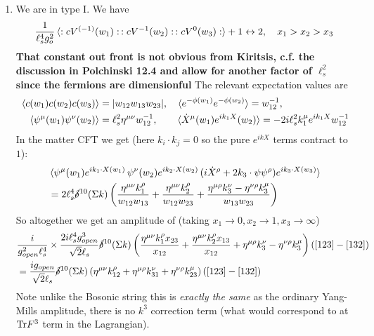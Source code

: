 \documentclass[11pt, class=article, crop=false]{standalone}
\begin{document}
\begin{enumerate}
	\item We are in type I. We have 
	\[
		\frac{1}{\ell_s^4 g_o^2} \braket{:c V^{(-1)}(w_1):\, :c V^{-1}(w_2):\, :c V^{0}(w_3):} + 1 \leftrightarrow 2, \quad x_1 > x_2 > x_3
	\]
	\textbf{That constant out front is not obvious from Kiritsis, c.f. the discussion in Polchinski 12.4 and allow for another factor of $\ell_s^2$ since the fermions are dimensionful}
	The relevant expectation values are
	\[
	\begin{aligned}
		\braket{c(w_1) c(w_2) c(w_3)} &= |w_{12} w_{13} w_{23}|, \quad \braket{e^{-\phi(w_1)} e^{-\phi(w_2)}} = w_{12}^{-1},\\
		\quad \braket{\psi^\mu(w_1) \psi^\nu (w_2)} &= \ell_s^2 \eta^{\mu \nu} w_{12}^{-1}, 
		\qquad \braket{\dot X^\mu(w_1) e^{i k_1 X} (w_2)} = -2 i \ell_s^2 k_1^\mu e^{i k_1 X} w_{12}^{-1} 
	\end{aligned}
	\]
	In the matter CFT we get (here $k_i \cdot k_j = 0$ so the pure $e^{i k X}$ terms contract to $1$):
	\[
	\begin{aligned}
		&\braket{\psi^\mu (w_1) e^{i k_1 \cdot X(w_1)}\, \psi^\nu (w_2) e^{i k_2 \cdot X(w_2)} \, (i \dot X^\rho + 2 k_3 \cdot \psi \psi^\rho) e^{i k_3 \cdot X(w_3)} } \\
		&= 2 \ell_s^4 \cancel\delta^{10}(\Sigma k) \left(\frac{\eta^{\mu \nu}k_1^\rho}{w_{12} w_{13}} + \frac{\eta^{\mu \nu} k_2^\rho}{w_{12} w_{23}} + \frac{\eta^{\mu \rho} k_3^\nu - \eta^{\nu \rho} k_3^\mu}{w_{13} w_{23}} \right)
	\end{aligned}
	\]
	So altogether we get an amplitude of (taking $x_1 \to 0, x_2 \to 1, x_3 \to \infty$)
	\[
	\begin{aligned}
		& \frac{i}{g_{open}^2 \ell_s^4} \times \frac{2 i \ell_s^4 g_{open}^3}{\sqrt 2 \ell_s} \cancel\delta^{10}(\Sigma k) \left(\frac{\eta^{\mu \nu}k_1^\rho x_{23}}{x_{12}} + \frac{\eta^{\mu \nu} k_2^\rho x_{13}}{x_{12}} + \eta^{\mu \rho} k_3^\nu - \eta^{\nu \rho} k_3^\mu \right) ([123] - [132])
		\\ &= 
		\frac{i g_{open}}{\sqrt 2 \ell_s} \cancel\delta^{10}(\Sigma k)  \left(\eta^{\mu \nu} k_{12}^\rho + \eta^{\mu \rho} k_{31}^\nu + \eta^{\nu \rho} k_{23}^\mu \right) ([123] - [132])
	\end{aligned}
	\]
	Note unlike the Bosonic string this is \emph{exactly the same} as the ordinary Yang-Mills amplitude, there is no $k^3$ correction term (what would correspond to at $\mathrm{Tr} F^3$ term in the Lagrangian).
	

\end{enumerate}
\end{document}
